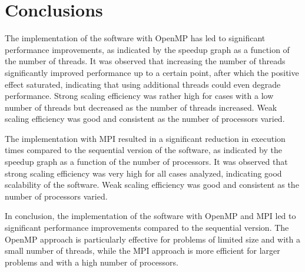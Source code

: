\documentclass[a4paper, 12pt]{report}
\begin{document}
\chapter*{Conclusions}
\begin{sloppypar}
  \noindent
  The implementation of the software with OpenMP has led to significant performance improvements, as indicated by the speedup graph as a function of the number of threads. It was observed that increasing the number of threads significantly improved performance up to a certain point, after which the positive effect saturated, indicating that using additional threads could even degrade performance. Strong scaling efficiency was rather high for cases with a low number of threads but decreased as the number of threads increased. Weak scaling efficiency was good and consistent as the number of processors varied.

  \bigskip
  \noindent
  The implementation with MPI resulted in a significant reduction in execution times compared to the sequential version of the software, as indicated by the speedup graph as a function of the number of processors. It was observed that strong scaling efficiency was very high for all cases analyzed, indicating good scalability of the software. Weak scaling efficiency was good and consistent as the number of processors varied.

  \bigskip
  \noindent
  In conclusion, the implementation of the software with OpenMP and MPI led to significant performance improvements compared to the sequential version. The OpenMP approach is particularly effective for problems of limited size and with a small number of threads, while the MPI approach is more efficient for larger problems and with a high number of processors.
\end{sloppypar}
  
\end{document}
